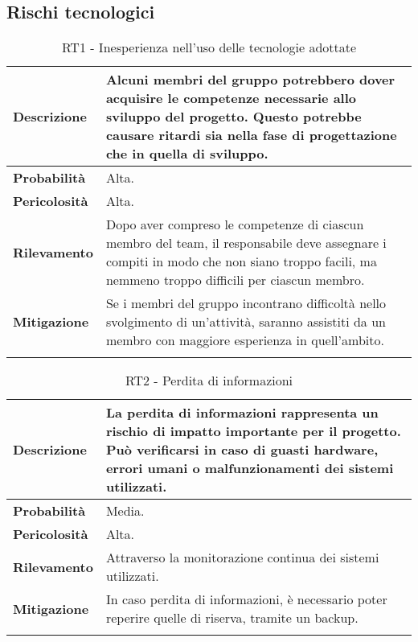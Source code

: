 
\subsection{Rischi tecnologici}
\begin{longtable}{ | l | p{12cm} | }
    \hline
    \textbf{Descrizione} & Alcuni membri del gruppo potrebbero dover acquisire le competenze necessarie allo sviluppo del progetto. Questo potrebbe causare ritardi sia nella fase di progettazione che in quella di sviluppo. \\
    \hline
    \textbf{Probabilità} & Alta. \\
    \hline
    \textbf{Pericolosità} & Alta. \\
    \hline
    \textbf{Rilevamento} & Dopo aver compreso le competenze di ciascun membro del team, il responsabile deve assegnare i compiti in modo che non siano troppo facili, ma nemmeno troppo difficili per ciascun membro. \\
    \hline
    \textbf{Mitigazione} & Se i membri del gruppo incontrano difficoltà nello svolgimento di un'attività, saranno assistiti da un membro con maggiore esperienza in quell'ambito. \\
    \hline
    \caption{RT1 - Inesperienza nell'uso delle tecnologie adottate}
    \label{table:5}
\end{longtable}
\newpage
\begin{longtable}{ | l | p{12cm} | }
    \hline
    \textbf{Descrizione} & La perdita di informazioni rappresenta un rischio di impatto importante per il progetto. Può verificarsi in caso di guasti hardware, errori umani o malfunzionamenti dei sistemi utilizzati. \\
    \hline
    \textbf{Probabilità} & Media. \\
    \hline
    \textbf{Pericolosità} & Alta. \\
    \hline
    \textbf{Rilevamento} & Attraverso la monitorazione continua dei sistemi utilizzati. \\
    \hline
    \textbf{Mitigazione} & In caso perdita di informazioni, è necessario poter reperire quelle di riserva, tramite un backup.\\
    \hline
    \caption{RT2 - Perdita di informazioni}
    \label{table:6}
\end{longtable}

